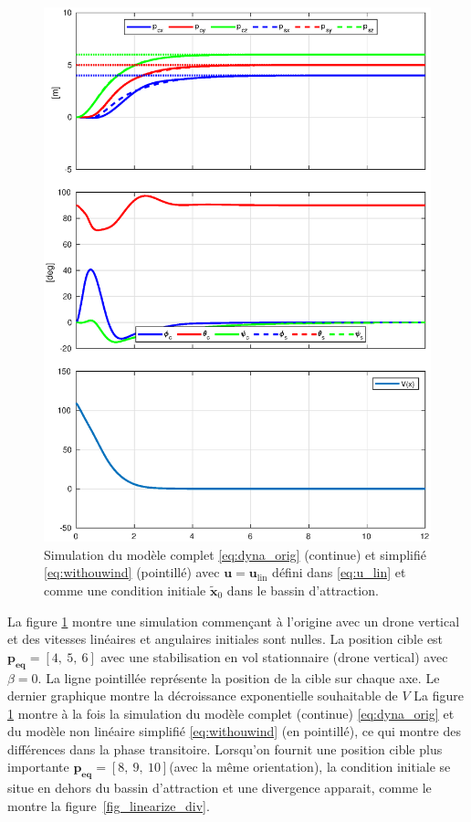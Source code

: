 \begin{figure}[ht!]
    \centering
    \includegraphics[trim=0cm 0.6cm 0cm 1cm,clip,width=0.8\columnwidth]{figures/converge2.eps}
    \caption{Simulation du modèle complet \eqref{eq:dyna_orig} (continue) et simplifié \eqref{eq:withouwind} (pointillé) avec $\boldsymbol{u} = \boldsymbol{u}_{\text{lin}}$ défini dans 
    \eqref{eq:u_lin} et comme une condition initiale $\tilde{ \boldsymbol{x}}_0$ dans le bassin d'attraction.}
    \label{fig_linearize_conv}
\end{figure}

La figure \ref{fig_linearize_conv} montre une simulation commençant à l'origine avec un drone vertical et des vitesses linéaires et angulaires initiales sont nulles. La position cible est $\boldsymbol{p_{\text{eq}}} = [4,~5,~6]$ avec une stabilisation en vol stationnaire (drone vertical) avec $\beta = 0$. La ligne pointillée représente la position de la cible sur chaque axe. Le dernier graphique montre la décroissance exponentielle souhaitable de $V$
La figure \ref{fig_linearize_conv} montre à la fois la simulation du modèle complet (continue) \eqref{eq:dyna_orig} et du modèle non linéaire simplifié \eqref{eq:withouwind} (en pointillé), ce qui montre des différences dans la phase transitoire.
Lorsqu'on fournit une position cible plus importante $\boldsymbol{p_{\text{eq}}} =[8,~9,~10]$(avec la même orientation), la condition initiale se situe en dehors du bassin d'attraction et une divergence apparait, comme le montre la figure~\ref{fig_linearize_div}.

